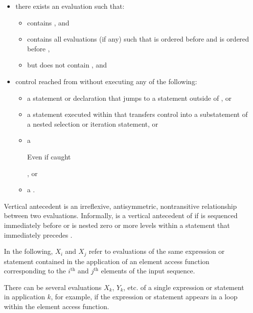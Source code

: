 \begin{itemize}
\item there exists an evaluation  such that:
  \begin{itemize}
    \item {} contains , and
    \item {} contains all evaluations  (if any) such that  is ordered before  and  is ordered before ,
    \item but  does not contain , and
  \end{itemize}
\item control reached  from  without executing any of the following:
  \begin{itemize}
    \item a  statement or  declaration that jumps to a statement outside of , or
    \item a  statement executed within  that transfers control into a substatement of a nested selection or iteration statement, or
    \item a  \begin{note}Even if caught\end{note}, or
    \item a .
  \end{itemize}
\end{itemize}

\begin{note}
Vertical antecedent is an irreflexive, antisymmetric, nontransitive relationship between two evaluations. Informally,  is a vertical antecedent of  if  is sequenced immediately before  or  is nested zero or more levels within a statement  that immediately precedes .
\end{note}

\pnum
In the following, $X_i$ and $X_j$ refer to evaluations of the same expression
or statement contained in the application of an element access function
corresponding to the $i^\text{th}$ and $j^\text{th}$ elements of the input sequence.
\begin{note}There can be several evaluations $X_k$, $Y_k$, etc. of a single
expression or statement in application $k$, for example, if the expression or
statement appears in a loop within the element access function.\end{note}


